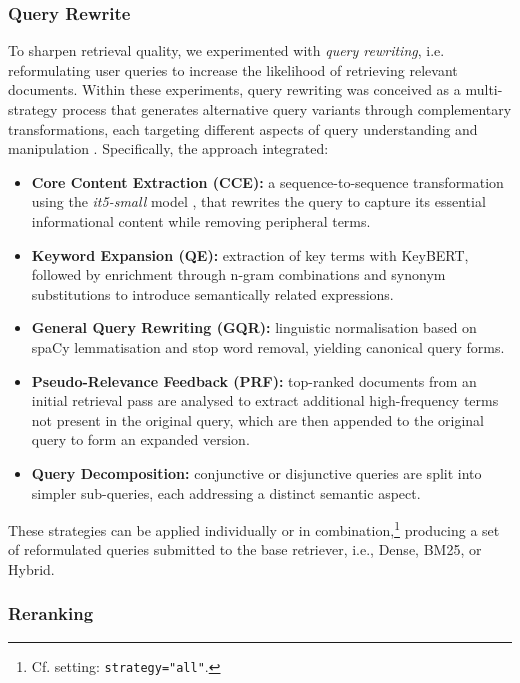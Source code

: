 \begin{spacing}{1.5}
\noindent \subsubsection*{\Large Query Rewrite}
To sharpen retrieval quality, we experimented with \textit{query rewriting}, i.e. reformulating user queries to increase the likelihood of retrieving relevant documents. Within these experiments, query rewriting was conceived as a multi-strategy process that generates alternative query variants through complementary transformations, each targeting different aspects of query understanding and manipulation \citep{li_dmqr-rag_2024}. Specifically, the approach integrated:
\begin{itemize}
      \item \textbf{Core Content Extraction (CCE):} a sequence-to-sequence transformation using the \textit{it5-small} model \parencite{sarti_it5_2024}, that rewrites the query to capture its essential informational content while removing peripheral terms.
      \item \textbf{Keyword Expansion (QE):} extraction of key terms with KeyBERT, followed by enrichment through n-gram combinations and synonym substitutions to introduce semantically related expressions.
      \item \textbf{General Query Rewriting (GQR):} linguistic normalisation based on spaCy lemmatisation and stop word removal, yielding canonical query forms.
      \item \textbf{Pseudo-Relevance Feedback (PRF):} top-ranked documents from an initial retrieval pass are analysed to extract additional high-frequency terms not present in the original query, which are then appended to the original query to form an expanded version.
      \item \textbf{Query Decomposition:} conjunctive or disjunctive queries are split into simpler sub-queries, each addressing a distinct semantic aspect.
\end{itemize}

These strategies can be applied individually or in combination,\footnote{Cf. setting: \texttt{strategy="all"}.} producing a set of reformulated queries submitted to the base retriever, i.e., Dense, BM25, or Hybrid.\\


\noindent\subsubsection*{\Large Reranking}


\end{spacing}
